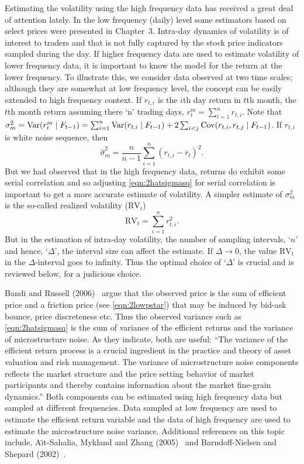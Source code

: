 Estimating the volatility using the high frequency data has received a great deal of attention lately. In the low frequency (daily) level some estimators based on select prices were presented in Chapter~3. Intra-day dynamics of volatility is of interest to traders and that is not fully captured by the stock price indicators sampled during the day. If higher frequency data are used to estimate volatility of lower frequency data, it is important to know the model for the return at the lower frequency. To illustrate this, we consider data observed at two time scales; although they are somewhat at low frequency level, the concept can be easily extended to high frequency context. If $r_{t,i}$ is the $i$th day return in $t$th month, the $t$th month return assuming there `n' trading days, $r_t^m = \sum_{i=1}^n r_{t,i}$. Note that $\sigma_m^2 = \operatorname{Var}(r_t^m \;|\; F_{t-1}) = \sum_{i=1}^n \operatorname{Var}(r_{t,i} \;|\; F_{t-1}) + 2 \sum_{i<j} \operatorname{Cov}(r_{t,i}, r_{t,j} \;|\; F_{t-1})$. If $r_{t,i}$ is white noise sequence, then
	\begin{equation}\label{eqn:2hatsigmasq}
	\hat{\sigma}_m^2 = \frac{n}{n-1} \sum_{i=1}^n (r_{t,i} - \overline{r}_t)^2.
	\end{equation}
But we had observed that in the high frequency data, returns do exhibit some serial correlation and so adjusting \eqref{eqn:2hatsigmasq} for serial correlation is important to get a more accurate estimate of volatility. A simpler estimate of $\sigma_m^2$ is the so-called realized volatility ($\text{RV}_t$)
	\begin{equation} \label{eqn:2RV}
	\text{RV}_t = \sum_{i=1}^n r_{t,i}^2.
	\end{equation}
But in the estimation of intra-day volatility, the number of sampling intervals, `$n$' and hence, `$\Delta$', the interval size can affect the estimate. If $\Delta \rightarrow 0$, the value $\text{RV}_t$ in the $\Delta$-interval goes to infinity. Thus the optimal choice of `$\Delta$' is crucial and is reviewed below, for a judicious choice.


Bandi and Russell (2006)~\cite{bandi} argue that the observed price is the sum of efficient price and a friction price (see \eqref{eqn:2lowpstar}) that may be induced by bid-ask bounce, price discreteness etc. Thus the observed variance such as \eqref{eqn:2hatsigmasq} is the sum of variance of the efficient returns and the variance of microstructure noise. As they indicate, both are useful: ``The variance of the efficient return process is a crucial ingredient in the practice and theory of asset valuation and risk management. The variance of microstructure noise components reflects the market structure and the price setting behavior of market participants and thereby contains information about the market fine-grain dynamics.'' Both components can be estimated using high frequency data but sampled at different frequencies. Data sampled at low frequency are used to estimate the efficient return variable and the data of high frequency are used to estimate the microstructure noise variance. Additional references on this topic include, A{\"\i}t-Sahalia, Mykland and Zhang (2005)~\cite{ait2005often} and Barndoff-Nielsen and Shepard (2002)~\cite{barndorff2002econometric}.



